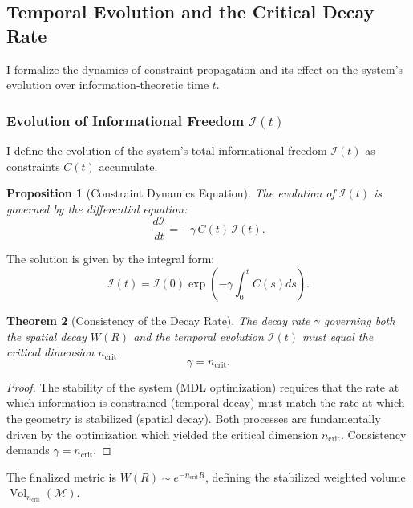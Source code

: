 \documentclass[11pt, a4paper]{article}
\newtheorem{theorem}{Theorem}[section]
\newtheorem{proposition}[theorem]{Proposition}
\theoremstyle{definition}
\theoremstyle{definition}
\newcommand{\M}{\mathcal{M}}
\newcommand{\Ical}{\mathcal{I}}
\newcommand{\Vol}{\operatorname{Vol}}
\newcommand{\VolNcrit}{\Vol_{\ncrit}}
\newcommand{\ncrit}{n_{\mathrm{crit}}}
\begin{document}
\subsection{Temporal Evolution and the Critical Decay Rate}

I formalize the dynamics of constraint propagation and its effect on the system's evolution over information-theoretic time $t$.

\subsubsection{Evolution of Informational Freedom \texorpdfstring{$\Ical(t)$}{Ical(t)}}

I define the evolution of the system's total informational freedom $\Ical(t)$ as constraints $C(t)$ accumulate.

\begin{proposition}[Constraint Dynamics Equation]
The evolution of $\Ical(t)$ is governed by the differential equation:
\begin{equation}
\frac{d\Ical}{dt} = - \gamma \, C(t) \, \Ical(t). \label{eq:dIdt}
\end{equation}
\end{proposition}
The solution is given by the integral form:
\begin{equation}
\Ical(t) = \Ical(0) \exp\left( - \gamma \int_0^t C(s) ds \right).
\end{equation}

\begin{theorem}[Consistency of the Decay Rate]\label{thm:gamma_ncrit}
The decay rate $\gamma$ governing both the spatial decay $W(R)$ and the temporal evolution $\Ical(t)$ must equal the critical dimension $\ncrit$.
\begin{equation}
    \gamma = \ncrit.
\end{equation}
\end{theorem}
\begin{proof}
The stability of the system (MDL optimization) requires that the rate at which information is constrained (temporal decay) must match the rate at which the geometry is stabilized (spatial decay). Both processes are fundamentally driven by the optimization which yielded the critical dimension $\ncrit$. Consistency demands $\gamma = \ncrit$.
\end{proof}

The finalized metric is $W(R) \sim e^{-\ncrit R}$, defining the stabilized weighted volume $\VolNcrit(\M)$.
\end{document}
